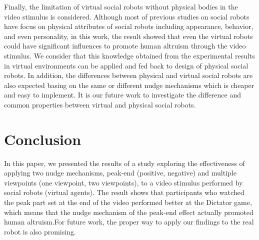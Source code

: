 \documentclass[runningheads]{llncs}
\begin{document}
Finally, the limitation of virtual social robots without physical bodies in the video stimulus is considered. Although most of previous studies on social robots have focus on physical attributes of social robots including appearance, behavior, and even personality, in this work, the result showed that even the virtual robots could have significant influences to promote human altruism through the video stimulus. We consider that this knowledge obtained from the experimental results in virtual environments can be applied and fed back to design of physical social robots.  In addition, the differences between physical and virtual social robots are also expected basing on the same or different nudge mechanisms which is cheaper and easy to implement. It is our future work to investigate the difference and common properties between virtual and physical social robots.


\section{Conclusion}
In this paper, we presented the results of a study exploring the effectiveness of applying two nudge mechanisms, peak-end (positive, negative) and multiple viewpoints (one viewpoint, two viewpoints), to a video stimulus performed by social robots (virtual agents). The result shows that participants who watched the peak part set at the end of the video performed better at the Dictator game, which means that the nudge mechanism of the peak-end effect actually promoted human altruism.For future work, the proper way to apply our findings to the real robot is also promising.
\end{document}
